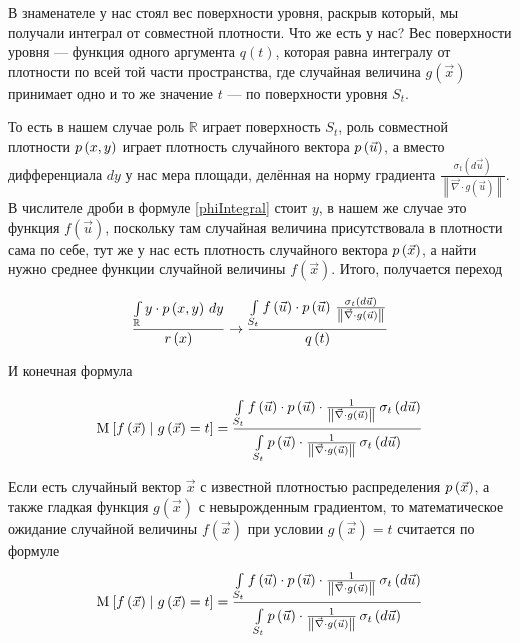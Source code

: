В знаменателе у нас стоял вес поверхности уровня,
раскрыв который, мы получали интеграл от совместной плотности.
Что же есть у нас?
Вес поверхности уровня --- функция одного аргумента $q\left( t \right)$,
которая равна интегралу от плотности по всей той части пространства,
где случайная величина $g\left( \vec{x} \right)$
принимает одно и то же значение $t$ --- по поверхности уровня $S_t$.

То есть в нашем случае роль $\mathbb{R}$ играет поверхность $S_t$,
роль совместной плотности $\pdf{x,y}$ играет плотность случайного вектора
$\pdf{\vec{u}}$, а вместо дифференциала $dy$ у нас мера площади,
делённая на норму градиента $\frac{\sigma_{t}\left( d\vec{u} \right)}
{\left\| \vec{\nabla} \cdot g\left( \vec{u} \right) \right\|}$.
В числителе дроби в формуле \eqref{phiIntegral} стоит $y$,
в нашем же случае это функция $f\left( \vec{u} \right)$,
поскольку там случайная величина присутствовала в плотности сама по себе,
тут же у нас есть плотность случайного вектора $\pdf{\vec{x}}$,
а найти нужно среднее функции случайной величины $f\left( \vec{x} \right)$.
Итого, получается переход

$$\frac{\integral{\mathbb{R}}{}{y}{y \cdot \pdf{x,y}}}{r\left( x \right)}
  \rightarrow
      \frac{\integrall{S_t}{\frac{\sigma_{t}\left( d\vec{u} \right)}{
      \left\| \vec{\nabla} \cdot g\left( \vec{u} \right) \right\|}}{
      f\left( \vec{u} \right) \cdot \pdf{\vec{u}}}}{q\left( t \right)}$$

И конечная формула

$$\Mean{ f\left( \vec{x} \right) \mcond g\left( \vec{x} \right) = t }
  = \frac{\integrall{S_t}{\sigma_{t}\left(d\vec{u} \right)}{
      f\left( \vec{u} \right) \cdot \pdf{\vec{u}} \cdot \frac{1}{
      \left\| \vec{\nabla} \cdot g\left( \vec{u} \right) \right\|}}}
      {\integrall{S_t}{\sigma_{t}\left(d\vec{u} \right)}{
      \pdf{\vec{u}} \cdot \frac{1}{
      \left\| \vec{\nabla} \cdot g\left( \vec{u} \right) \right\|}}}$$

\begin{theorem}
  \label{conditionalExpectationDefinition}
  Если есть случайный вектор $\vec{x}$ с известной плотностью распределения
  $\pdf{\vec{x}}$, а также гладкая функция $g\left( \vec{x} \right)$
  с невырожденным градиентом, то математическое ожидание случайной величины
  $f\left( \vec{x} \right)$ при условии $g\left( \vec{x} \right) = t$
  считается по формуле
  $$\Mean{f\left( \vec{x} \right) \mcond g\left( \vec{x} \right) = t}
      = \frac{\integrall{S_t}{\sigma_{t}\left(d\vec{u} \right)}{
      f\left( \vec{u} \right) \cdot \pdf{\vec{u}} \cdot \frac{1}{
      \left\| \vec{\nabla} \cdot g\left( \vec{u} \right) \right\|}}}
      {\integrall{S_t}{\sigma_{t}\left(d\vec{u} \right)}{
      \pdf{\vec{u}} \cdot \frac{1}{
    \left\| \vec{\nabla}
        \cdot g\left( \vec{u} \right) \right\|}}}$$
\end{theorem}

